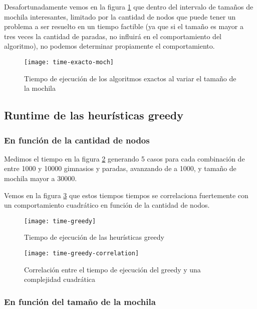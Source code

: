 Desafortunadamente vemos en la figura \ref{fig:time-exacto-moch} que dentro del intervalo de tamaños de mochila
interesantes, limitado por la cantidad de nodos que puede tener un problema a ser resuelto en un tiempo factible
(ya que si el tamaño es mayor a tres veces la cantidad de paradas, no influirá en el comportamiento del algoritmo),
no podemos determinar propiamente el comportamiento.

\begin{figure}[H]
    \centering
    \texttt{[image: time-exacto-moch]}
    \caption{Tiempo de ejecución de los algoritmos exactos al variar el tamaño de la mochila}
    \label{fig:time-exacto-moch}
\end{figure}

\subsection{Runtime de las heurísticas greedy}

\subsubsection{En función de la cantidad de nodos}

Medimos el tiempo en la figura \ref{fig:time-greedy} generando 5 casos para cada combinación de entre 1000 y 10000 gimnasios y paradas, avanzando de a 1000, y tamaño de mochila mayor a 30000.

Vemos en la figura \ref{fig:time-greedy-correlation} que estos tiempos tiempos se correlaciona fuertemente con un comportamiento cuadrático en función de la cantidad de nodos.

\begin{figure}[H]
    \centering
    \texttt{[image: time-greedy]}
    \caption{Tiempo de ejecución de las heurísticas greedy}
    \label{fig:time-greedy}
\end{figure}

\begin{figure}[H]
    \centering
    \texttt{[image: time-greedy-correlation]}
    \caption{Correlación entre el tiempo de ejecución del greedy y una complejidad cuadrática}
    \label{fig:time-greedy-correlation}
\end{figure}

\subsubsection{En función del tamaño de la mochila}

